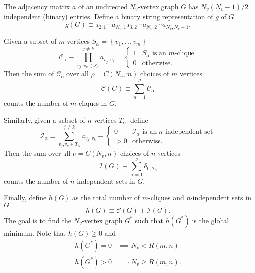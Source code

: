\documentclass[a4paper]{article}
\newcommand{\set}[1]{\left\{ #1 \right\}}
\begin{document}
The adjacency matrix $a$ of an undirected $N_v$-vertex graph $G$ has
$N_v(N_v-1)/2$ independent (binary) entries. Define a binary string
representation of $g$ of
$G$
\[
g(G) \equiv a_{2,1} \cdots a_{N_v,1} a_{3,2} \cdots a_{N_v,2}
\cdots a_{N_v,N_v-1}.
\]

Given a subset of $m$ vertices $S_{\alpha}=\set{v_1,\dots,v_m}$
\[
\mathcal{C}_{\alpha} \equiv
\prod_{v_j, v_k \in S_{\alpha}}^{j \neq k} a_{v_j, v_k} =
\begin{cases}
  1 & S_\alpha \text{ is an $m$-clique} \\
  0 & \text{otherwise.}
\end{cases}
\]
Then the sum of $\mathcal{C}_{\alpha}$ over all $\rho=C(N_v,m)$ choices of $m$
vertices
\[
\mathcal{C}(G) \equiv \sum_{\alpha=1}^{\rho} \mathcal{C}_{\alpha}
\]
counts the number of $m$-cliques in $G$.

Similarly, given a subset of $n$ vertices $T_{\alpha}$, define
\[
\mathcal{I}_{\alpha} \equiv
\sum_{v_j, v_k \in T_{\alpha}}^{j \neq k} a_{v_j, v_k} =
\begin{cases}
  0 & \mathcal{I}_{\alpha} \text{ is an $n$-independent set} \\
  >0 & \text{otherwise.}
\end{cases}
\]
Then the sum over all $\nu=C(N_v,n)$ choices of $n$ vertices
\[
\mathcal{I}(G) \equiv \sum_{\alpha=1}^{\nu} \delta_{0, \mathcal{I}_{\alpha}}
\]
counts the number of $n$-independent sets in $G$.

Finally, define $h(G)$ as the total number of $m$-cliques and $n$-independent
sets in $G$
\[
h(G) \equiv \mathcal{C}(G) + \mathcal{I}(G).
\]
The goal is to find the $N_v$-vertex graph $G^*$ such that $h(G^*)$ is the
global minimum. Note that $h(G) \geq 0$ and
\begin{align*}
h(G^*) = 0 &\implies N_v < R(m,n) \\
h(G^*) > 0 &\implies N_v \geq R(m,n).
\end{align*}
\end{document}

